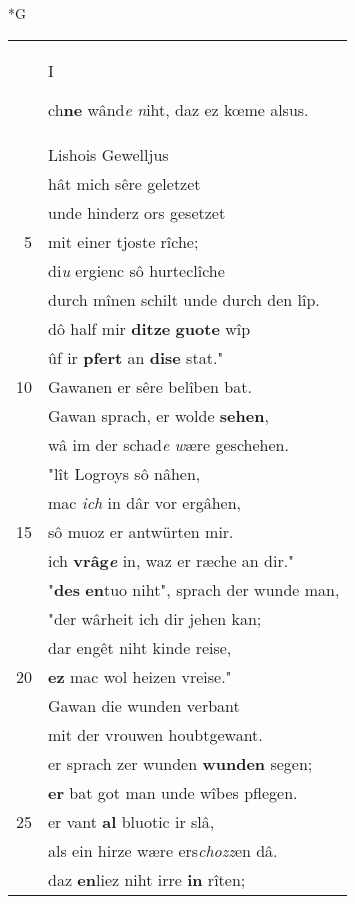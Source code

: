 \documentclass[8pt,a4paper,notitlepage]{article}
\begin{document}
\begin{table}[ht]
\begin{minipage}[t]{0.5\linewidth}
\small
\begin{center}*G
\end{center}
\begin{tabular}{rl}
 & \begin{large}I\end{large}ch\textbf{ne} wând\textit{e} \textit{n}iht, daz ez kœme alsus.\\ 
 & Lishois Gewelljus\\ 
 & hât mich sêre geletzet\\ 
 & unde hinderz ors gesetzet\\ 
5 & mit einer tjoste rîche;\\ 
 & di\textit{u} ergienc sô hurteclîche\\ 
 & durch mînen schilt unde durch den lîp.\\ 
 & dô half mir \textbf{ditze} \textbf{guote} wîp\\ 
 & ûf ir \textbf{pfert} an \textbf{dise} stat."\\ 
10 & Gawanen er sêre belîben bat.\\ 
 & Gawan sprach, er wolde \textbf{sehen},\\ 
 & wâ im der schad\textit{e} \textit{w}ære geschehen.\\ 
 & "lît Logroys sô nâhen,\\ 
 & mac \textit{ich} in dâr vor ergâhen,\\ 
15 & sô muoz er antwürten mir.\\ 
 & ich \textbf{vrâg\textit{e}} in, waz er ræche an dir."\\ 
 & "\textbf{des} \textbf{en}tuo niht", sprach der wunde man,\\ 
 & "der wârheit ich dir jehen kan;\\ 
 & dar engêt niht kinde reise,\\ 
20 & \textbf{ez} mac wol heizen vreise."\\ 
 & Gawan die wunden verbant\\ 
 & mit der vrouwen houbtgewant.\\ 
 & er sprach zer wunden \textbf{wunden} segen;\\ 
 & \textbf{er} bat got man unde wîbes pflegen.\\ 
25 & er vant \textbf{al} bluotic ir slâ,\\ 
 & als ein hirze wære ers\textit{chozz}en dâ.\\ 
 & daz \textbf{en}liez niht irre \textbf{in} rîten;\\ 

\end{tabular}
\end{minipage}
\end{table}
\end{document}
